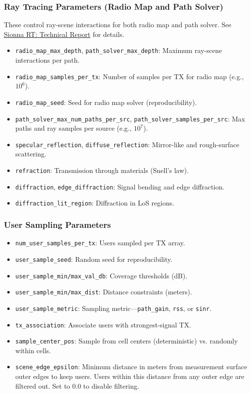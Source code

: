\documentclass{article}
\begin{document}
\subsubsection{Ray Tracing Parameters (Radio Map and Path Solver)}
These control ray-scene interactions for both radio map and path solver. See \href{https://arxiv.org/pdf/2504.21719}{Sionna RT: Technical Report} for details.
\begin{itemize}
  \item \texttt{radio\_map\_max\_depth}, \texttt{path\_solver\_max\_depth}: Maximum ray-scene interactions per path.
  \item \texttt{radio\_map\_samples\_per\_tx}: Number of samples per TX for radio map (e.g., $10^6$).
  \item \texttt{radio\_map\_seed}: Seed for radio map solver (reproducibility).
  \item \texttt{path\_solver\_max\_num\_paths\_per\_src}, \texttt{path\_solver\_samples\_per\_src}: Max paths and ray samples per source (e.g., $10^7$).
  \item \texttt{specular\_reflection}, \texttt{diffuse\_reflection}: Mirror-like and rough-surface scattering.
  \item \texttt{refraction}: Transmission through materials (Snell's law).
  \item \texttt{diffraction}, \texttt{edge\_diffraction}: Signal bending and edge diffraction.
  \item \texttt{diffraction\_lit\_region}: Diffraction in LoS regions.
\end{itemize}

\subsubsection{User Sampling Parameters}
\begin{itemize}
  \item \texttt{num\_user\_samples\_per\_tx}: Users sampled per TX array.
  \item \texttt{user\_sample\_seed}: Random seed for reproducibility.
  \item \texttt{user\_sample\_min/max\_val\_db}: Coverage thresholds (dB).
  \item \texttt{user\_sample\_min/max\_dist}: Distance constraints (meters).
  \item \texttt{user\_sample\_metric}: Sampling metric---\texttt{path\_gain}, \texttt{rss}, or \texttt{sinr}.
  \item \texttt{tx\_association}: Associate users with strongest-signal TX.
  \item \texttt{sample\_center\_pos}: Sample from cell centers (deterministic) vs. randomly within cells.
  \item \texttt{scene\_edge\_epsilon}: Minimum distance in meters from measurement surface outer edges to keep users. Users within this distance from any outer edge are filtered out. Set to 0.0 to disable filtering.
\end{itemize}
\end{document}
